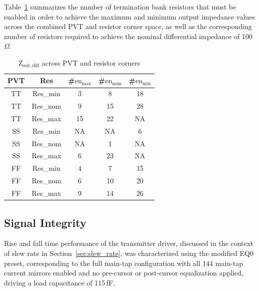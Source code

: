 Table~\ref{tab:zout_PVT} summarizes the number of termination bank resistors that must be enabled in order to achieve the maximum and minimum output impedance values across the combined \ac{PVT} and resistor corner space, as well as the corresponding number of resistors required to achieve the nominal differential impedance of 100\,$\Omega$. 

\begin{table}[H]
 \centering
 \caption{$\mathrm{Z_{out, diff}}$ across \ac{PVT} and resistor corners}
 \label{tab:zout_PVT}
 \begin{tabular}{ccccc}
  \hline
  \textbf{PVT} & \textbf{Res} & \textbf{\#$\mathrm{en_{max}}$} & \textbf{\#$\mathrm{en_{nom}}$} & \textbf{\#$\mathrm{en_{min}}$}\\
  \hline \hline
  TT & Res\_min & 3 & 8 & 18\\
  TT & Res\_nom & 9 & 15 & 28\\
  TT & Res\_max & 15 & 22 & NA\\
  SS & Res\_min & NA & NA & 6\\ %
  SS & Res\_nom & NA & 1 & NA\\
  SS & Res\_max & 6 & 23 & NA\\
  FF & Res\_min & 4 & 7 & 15\\
  FF & Res\_nom & 6 & 10 & 20\\
  FF & Res\_max & 9 & 14 & 26\\
  \hline \hline
 \end{tabular}
\end{table}

\subsection{Signal Integrity}\label{sec:pre_SI}

Rise and fall time performance of the transmitter driver, discussed in the context of slew rate in Section~\ref{sec:slew_rate}, was characterized using the modified EQ0 preset, corresponding to the full main-tap configuration with all 144 main-tap current mirrors enabled and no pre-cursor or post-cursor equalization applied, driving a load capacitance of 115\,fF.


